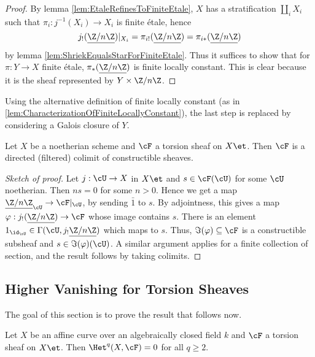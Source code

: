 \begin{proof} 
By lemma \ref{lem:EtaleRefinesToFiniteEtale}, $X$ has a stratification $\coprod_i X_i$ such that $\pi_i: j^{-1}(X_i)\to X_i$ is finite \'etale, hence
$$
j_!(\underline{\Z/n\Z})|_{X_i} = 
\pi_{i!}(\underline{\Z/n\Z}) = 
\pi_{i*}(\underline{\Z/n\Z})
$$
by lemma \ref{lem:ShriekEqualsStarForFiniteEtale}. Thus it suffices to show that for $\pi: Y\to X$ finite \'etale, $\pi_*(\underline{\Z/n\Z})$ is finite locally constant. This is clear because it is the sheaf represented by $Y\times \Z/n\Z$.
\end{proof}

\begin{remark}
Using the alternative definition of finite locally constant (as in \ref{lem:CharacterizationOfFiniteLocallyConstant}), the last step is replaced by considering a Galois closure of $Y$.
\end{remark}

\begin{lem} \label{lem:TosionSheavesAreColimitsOfConstructibleOnes}
Let $X$ be a noetherian scheme and $\cF$ a torsion sheaf on $X\et$. Then $\cF$ is a directed (filtered) colimit of constructible sheaves.
\end{lem}

\begin{proof}[Sketch of proof]
Let $j: \cU \to X$ in $X\et$ and $s\in \cF(\cU)$ for some $\cU$ noetherian. Then $ns = 0$ for some $n>0$. Hence we get a map $\underline{\Z/n\Z}_\cU\to \cF|_\cU$, by sending $\bar 1$ to $s$. By adjointness, this gives a map $\varphi: j_!(\underline{\Z/n\Z}) \to \cF$ whose image contains $s$. There is an element $1_{\id_\cU} \in \Gamma(\cU, j_!\underline{\Z/n\Z})$ which maps to $s$. Thus, $\Im(\varphi) \subseteq \cF$ is a constructible subsheaf and $s\in \Im(\varphi)(\cU)$. A similar argument applies for a finite collection of section, and the result follows by taking colimits.
\end{proof}

\subsection{Higher Vanishing for Torsion Sheaves}
\label{subsection:HigherVanishingForTorsionSheaves}

The goal of this section is to prove the result that follows now.

\begin{thm} \label{thm:VanishingForAffineCurves}
Let $X$ be an affine curve over an algebraically closed field $k$ and $\cF$ a torsion sheaf on $X\et$. Then $\Het^q(X, \cF) = 0$ for all $q\geqslant 2$. 
\end{thm}

